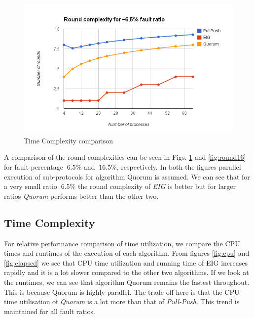 \begin{figure}[ht]
 \centering
\includegraphics[scale=0.4]{Round6}
\caption{Time Complexity comparison}
 \label{fig:round6}
\end{figure}

A comparison of the round complexities can be seen in Figs. \ref{fig:round6} and \ref{fig:round16} for fault percentage $~6.5\%$ and $~16.5\%$, respectively. In both the figures parallel execution of sub-protocols for algorithm Quorum is assumed. We can see that for a very small ratio $~6.5\%$ the round complexity of \textit{EIG} is better but for larger ratios \textit{Quorum} performs better than the other two. 


\subsection{Time Complexity}

For relative performance comparison of time utilization, we compare the CPU times and runtimes of the execution of each algorithm.  From figures \ref{fig:cpu} and \ref{fig:elapsed} we see that CPU time utilization and running time of EIG increases rapidly and it is a lot slower compared to the other two algorithms. If we look at the runtimes, we can see that algorithm Quorum remains the fastest throughout. This is because Quorum is highly parallel. The trade-off here is that the CPU time utilisation of \textit{Quorum} is a lot more than that of \textit{Pull-Push}. This trend is maintained for all fault ratios.

